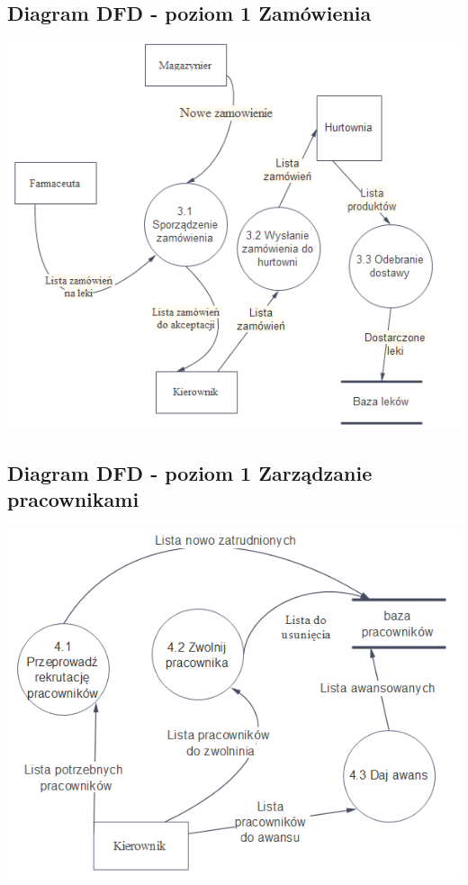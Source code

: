 \documentclass[a4paper, 11pt]{article}
\begin{document}
	\subsection{Diagram DFD - poziom 1 Zamówienia}
		\includegraphics[scale=1]{zamowienia3.PNG} 
		
	\subsection{Diagram DFD - poziom 1 Zarządzanie pracownikami}
		\includegraphics[scale=1]{zarzadzaniePracownikami2.PNG} 
		
\end{document}
